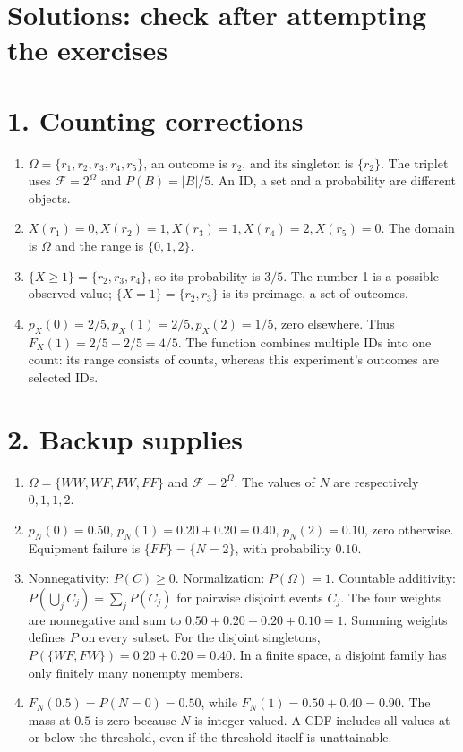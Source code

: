 \documentclass[11pt,a4paper]{article}
\begin{document}
\clearpage
\section*{Solutions: check after attempting the exercises}\label{solutions}
\section*{1. Counting corrections}
\begin{enumerate}
\item $\Omega=\{r_1,r_2,r_3,r_4,r_5\}$, an outcome is $r_2$, and its singleton is $\{r_2\}$. The triplet uses $\mathcal F=2^\Omega$ and $P(B)=|B|/5$. An ID, a set and a probability are different objects.
\item $X(r_1)=0,X(r_2)=1,X(r_3)=1,X(r_4)=2,X(r_5)=0$. The domain is $\Omega$ and the range is $\{0,1,2\}$.
\item $\{X\ge1\}=\{r_2,r_3,r_4\}$, so its probability is $3/5$. The number 1 is a possible observed value; $\{X=1\}=\{r_2,r_3\}$ is its preimage, a set of outcomes.
\item $p_X(0)=2/5,p_X(1)=2/5,p_X(2)=1/5$, zero elsewhere. Thus $F_X(1)=2/5+2/5=4/5$. The function combines multiple IDs into one count: its range consists of counts, whereas this experiment's outcomes are selected IDs.
\end{enumerate}

\section*{2. Backup supplies}
\begin{enumerate}
\item $\Omega=\{WW,WF,FW,FF\}$ and $\mathcal F=2^\Omega$. The values of $N$ are respectively $0,1,1,2$.
\item $p_N(0)=0.50$, $p_N(1)=0.20+0.20=0.40$, $p_N(2)=0.10$, zero otherwise. Equipment failure is $\{FF\}=\{N=2\}$, with probability $0.10$.
\item Nonnegativity: $P(C)\ge0$. Normalization: $P(\Omega)=1$. Countable additivity: $P(\bigcup_j C_j)=\sum_j P(C_j)$ for pairwise disjoint events $C_j$. The four weights are nonnegative and sum to $0.50+0.20+0.20+0.10=1$. Summing weights defines $P$ on every subset. For the disjoint singletons, $P(\{WF,FW\})=0.20+0.20=0.40$. In a finite space, a disjoint family has only finitely many nonempty members.
\item $F_N(0.5)=P(N=0)=0.50$, while $F_N(1)=0.50+0.40=0.90$. The mass at $0.5$ is zero because $N$ is integer-valued. A CDF includes all values at or below the threshold, even if the threshold itself is unattainable.
\end{enumerate}
\end{document}
